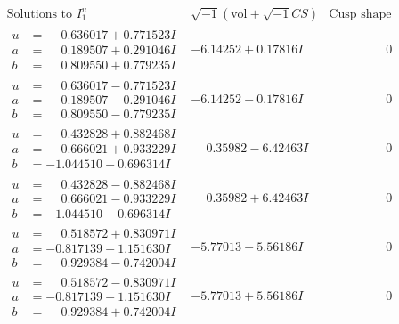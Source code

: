 \documentclass[1p]{elsarticle_modified}
\theoremstyle{definition}
\newcommand{\I}{\sqrt{-1}}
\begin{document}
$$\begin{array}{c|c|c}  
\text{Solutions to }I^u_{1}& \I (\text{vol} + \sqrt{-1}CS) & \text{Cusp shape}\\
 \hline 
\begin{aligned}
u &= \phantom{-}0.636017 + 0.771523 I \\
a &= \phantom{-}0.189507 + 0.291046 I \\
b &= \phantom{-}0.809550 + 0.779235 I\end{aligned}
 & -6.14252 + 0.17816 I & \phantom{-0.000000 } 0 \\ \hline\begin{aligned}
u &= \phantom{-}0.636017 - 0.771523 I \\
a &= \phantom{-}0.189507 - 0.291046 I \\
b &= \phantom{-}0.809550 - 0.779235 I\end{aligned}
 & -6.14252 - 0.17816 I & \phantom{-0.000000 } 0 \\ \hline\begin{aligned}
u &= \phantom{-}0.432828 + 0.882468 I \\
a &= \phantom{-}0.666021 + 0.933229 I \\
b &= -1.044510 + 0.696314 I\end{aligned}
 & \phantom{-}0.35982 - 6.42463 I & \phantom{-0.000000 } 0 \\ \hline\begin{aligned}
u &= \phantom{-}0.432828 - 0.882468 I \\
a &= \phantom{-}0.666021 - 0.933229 I \\
b &= -1.044510 - 0.696314 I\end{aligned}
 & \phantom{-}0.35982 + 6.42463 I & \phantom{-0.000000 } 0 \\ \hline\begin{aligned}
u &= \phantom{-}0.518572 + 0.830971 I \\
a &= -0.817139 - 1.151630 I \\
b &= \phantom{-}0.929384 - 0.742004 I\end{aligned}
 & -5.77013 - 5.56186 I & \phantom{-0.000000 } 0 \\ \hline\begin{aligned}
u &= \phantom{-}0.518572 - 0.830971 I \\
a &= -0.817139 + 1.151630 I \\
b &= \phantom{-}0.929384 + 0.742004 I\end{aligned}
 & -5.77013 + 5.56186 I & \phantom{-0.000000 } 0 \\ \hline\begin{aligned}

\end{aligned}
\end{array}$$
\end{document}
